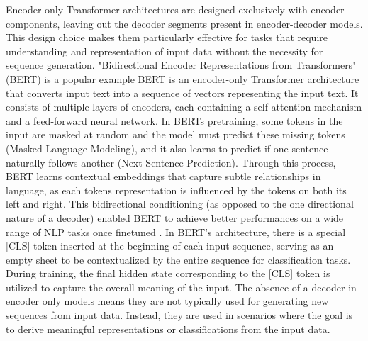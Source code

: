 Encoder only Transformer architectures
are designed exclusively with encoder components, 
leaving out the decoder segments present in encoder-decoder models. 
This design choice makes them particularly effective for tasks that require understanding and representation of input data 
without the necessity for sequence generation.
"Bidirectional Encoder Representations from Transformers" (BERT) \cite{bert} 
is a popular example
BERT is an encoder-only Transformer architecture that converts input text into a sequence of vectors representing the input text. 
It consists of multiple layers of encoders, each containing a self-attention mechanism and a feed-forward neural network. 
In BERTs pretraining, some tokens in the input are masked at random and the model must predict 
these missing tokens (Masked Language Modeling), 
and it also learns to predict if one sentence naturally follows another (Next Sentence Prediction). 
Through this process, BERT learns contextual embeddings that capture subtle relationships in language, 
as each tokens representation is influenced by the tokens on both its left and right. 
This bidirectional conditioning (as opposed to the one directional nature of a decoder) 
enabled BERT to achieve better performances on a wide range of NLP tasks once finetuned \cite{scoreBERT}.
In BERT's architecture, there is a special [CLS] token inserted at the beginning of each input sequence, 
serving as an empty sheet to be contextualized by the entire sequence for classification tasks. 
During training, the final hidden state corresponding to the [CLS] token is utilized to capture the overall meaning of the input.
The absence of a decoder in encoder only models means they are not typically used for generating new sequences from input data. 
Instead, they are used in scenarios where the goal is to derive meaningful representations or classifications from the input data.

